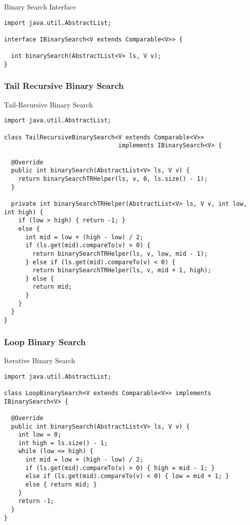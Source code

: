 \begin{cl}[]{Binary Search Interface}
\begin{lstlisting}[language=MyJava]
import java.util.AbstractList;

interface IBinarySearch<V extends Comparable<V>> {
  
  int binarySearch(AbstractList<V> ls, V v);
}
\end{lstlisting}
\end{cl}

\subsubsection*{Tail Recursive Binary Search}

\begin{cl}[]{Tail-Recursive Binary Search}
\begin{lstlisting}[language=MyJava]
import java.util.AbstractList;

class TailRecursiveBinarySearch<V extends Comparable<V>> 
                                implements IBinarySearch<V> {

  @Override
  public int binarySearch(AbstractList<V> ls, V v) {
    return binarySearchTRHelper(ls, v, 0, ls.size() - 1);
  }

  private int binarySearchTRHelper(AbstractList<V> ls, V v, int low, int high) {
    if (low > high) { return -1; }
    else {
      int mid = low + (high - low) / 2;
      if (ls.get(mid).compareTo(v) > 0) { 
        return binarySearchTRHelper(ls, v, low, mid - 1); 
      } else if (ls.get(mid).compareTo(v) < 0) { 
        return binarySearchTRHelper(ls, v, mid + 1, high); 
      } else { 
        return mid; 
      }
    }
  }
}
\end{lstlisting}
\end{cl}

\subsubsection*{Loop Binary Search}

\begin{cl}[]{Iterative Binary Search}
\begin{lstlisting}[language=MyJava]
import java.util.AbstractList;
  
class LoopBinarySearch<V extends Comparable<V>> implements IBinarySearch<V> {
  
  @Override
  public int binarySearch(AbstractList<V> ls, V v) {
    int low = 0;
    int high = ls.size() - 1;
    while (low <= high) {
      int mid = low + (high - low) / 2;
      if (ls.get(mid).compareTo(v) > 0) { high = mid - 1; } 
      else if (ls.get(mid).compareTo(v) < 0) { low = mid + 1; } 
      else { return mid; }
    }
    return -1;
  }
}
\end{lstlisting}
\end{cl}

